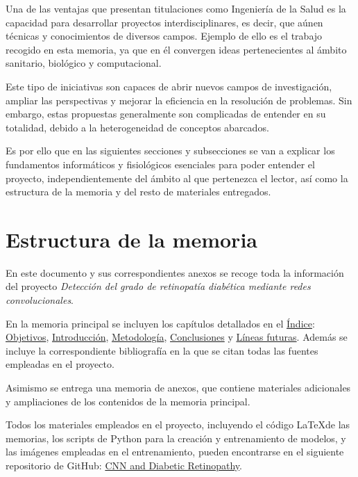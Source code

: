  \label{Intro}

\setlength{\parskip}{10pt}

Una de las ventajas que presentan titulaciones como Ingeniería de la Salud es la capacidad para desarrollar proyectos interdisciplinares, es decir, que aúnen técnicas y conocimientos de diversos campos. Ejemplo de ello es el trabajo recogido en esta memoria, ya que en él convergen ideas pertenecientes al ámbito sanitario, biológico y computacional.

Este tipo de iniciativas son capaces de abrir nuevos campos de investigación, ampliar las perspectivas y mejorar la eficiencia en la resolución de problemas. Sin embargo, estas propuestas generalmente son complicadas de entender en su totalidad, debido a la heterogeneidad de conceptos abarcados.

Es por ello que en las siguientes secciones y subsecciones se van a explicar los fundamentos informáticos y fisiológicos esenciales para poder entender el proyecto, independientemente del ámbito al que pertenezca el lector, así como la estructura de la memoria y del resto de materiales entregados.

\titlespacing{\section}{0pt}{0.25cm}{0.15cm}
\section{Estructura de la memoria}

En este documento y sus correspondientes anexos se recoge toda la información del proyecto \textit{Detección del grado de retinopatía diabética mediante redes convolucionales}.

En la memoria principal se incluyen los capítulos detallados en el \hyperref[toc]{Índice}: \hyperref[Obj]{Objetivos}, \hyperref[Intro]{Introducción}, \hyperref[Met]{Metodología}, \hyperref[Conc]{Conclusiones} y \hyperref[Fut]{Líneas futuras}. Además se incluye la correspondiente bibliografía en la que se citan todas las fuentes empleadas en el proyecto.

Asimismo se entrega una memoria de anexos, que contiene materiales adicionales y ampliaciones de los contenidos de la memoria principal.

Todos los materiales empleados en el proyecto, incluyendo el código \LaTeX de las memorias, los scripts de Python para la creación y entrenamiento de modelos, y las imágenes empleadas en el entrenamiento, pueden encontrarse en el siguiente repositorio de GitHub: \href{https://github.com/SamuelLozanoJuarez/CNN_and_Diabetic_Retinopathy}{CNN and Diabetic Retinopathy}.

